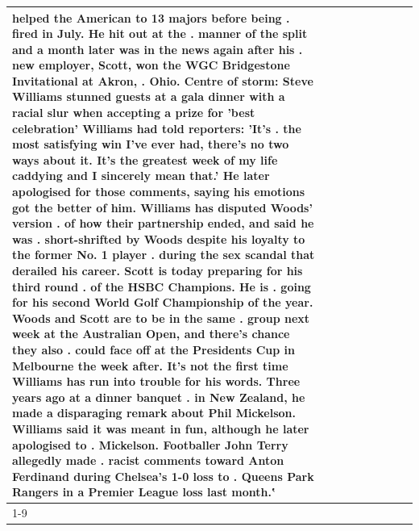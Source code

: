 \begin{table}[H]
\begin{tabular}{lllrlllll}
helped the American to 13 majors before being . fired in July. He hit out at the . manner of the split and a month later was in the news again after his . new employer, Scott, won the WGC Bridgestone Invitational at Akron, . Ohio. Centre of storm: Steve Williams stunned guests at a gala dinner with a racial slur when accepting a prize for 'best celebration' Williams had told reporters: 'It's . the most satisfying win I've ever had, there's no two ways about it. It's the greatest week of my life caddying and I sincerely mean that.' He later apologised for those comments, saying his emotions got the better of him. Williams has disputed Woods' version . of how their partnership ended, and said he was . short-shrifted by Woods despite his loyalty to the former No. 1 player . during the sex scandal that derailed his career. Scott is today preparing for his third round . of the HSBC Champions. He is . going for his second World Golf Championship of the year. Woods and Scott are to be in the same . group next week at the Australian Open, and there's chance they also . could face off at the Presidents Cup in Melbourne the week after. It's not the first time Williams has run into trouble for his words. Three years ago at a dinner banquet . in New Zealand, he made a disparaging remark about Phil Mickelson. Williams said it was meant in fun, although he later apologised to . Mickelson. Footballer John Terry allegedly made . racist comments toward Anton Ferdinand during Chelsea's 1-0 loss to . Queens Park Rangers in a Premier League loss last month.‛ \\
\cline{1-9}

\end{tabular}
\end{table}

